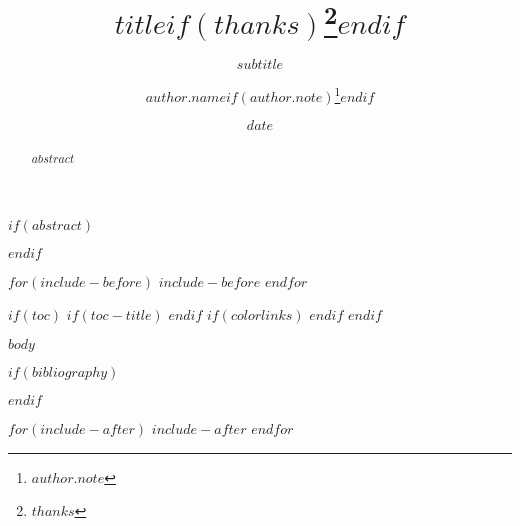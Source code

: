 \documentclass[
  11pt,
  a4paper
]{article}
\title{$title$$if(thanks)$\thanks{$thanks$}$endif$}
\subtitle{$subtitle$}
\author[$if(author.affil-id)$$author.affil-id$$endif$]{%
  $author.name$$if(author.note)$\thanks{$author.note$}$endif$
}
\author{}
\affil[$affiliations.id$]{$affiliations.name$}
\date{$date$}
\begin{document}
\maketitle
$if(abstract)$
\begin{abstract}
$abstract$
\end{abstract}
$endif$

$for(include-before)$
$include-before$
$endfor$

$if(toc)$
$if(toc-title)$
\renewcommand*\contentsname{$toc-title$}
$endif$
{
$if(colorlinks)$
\hypersetup{linkcolor=$if(toccolor)$$toccolor$$else$$endif$}
$endif$
\setcounter{tocdepth}{$toc-depth$}
\tableofcontents
}
$endif$

$body$

\clearpage

$if(bibliography)$

$endif$


$for(include-after)$
$include-after$
$endfor$
\end{document}
